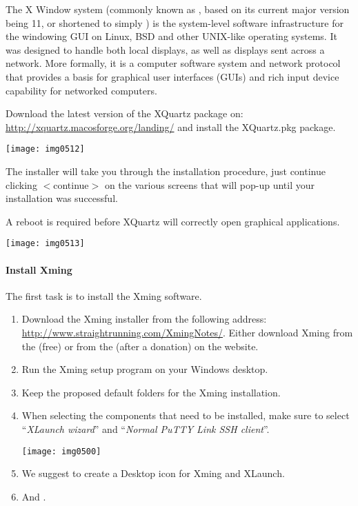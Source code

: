 The X Window system (commonly known as , based on its current major
version being 11, or shortened to simply ) is the system-level
software infrastructure for the windowing GUI on Linux, BSD and other UNIX-like
operating systems. It was designed to handle both local displays, as well as
displays sent across a network. More formally, it is a computer software system
and network protocol that provides a basis for graphical user interfaces (GUIs)
and rich input device capability for networked computers.

\ifmac
  Download the latest version of the XQuartz package on:
  \url{http://xquartz.macosforge.org/landing/}
  and install the XQuartz.pkg package.

  \begin{center}
  \texttt{[image: img0512]}
  \end{center}

  The installer will take you through the installation procedure, just continue
  clicking $<$continue$>$ on the various screens that will pop-up until your
  installation was successful.

  A reboot is required before XQuartz will correctly open graphical applications.

  \begin{center}
  \texttt{[image: img0513]}
  \end{center}
\fi

\ifwindows
  \paragraph{Install Xming}

  The first task is to install the Xming software.

  \begin{enumerate}
    \item  Download the Xming installer from the following
      address: \url{http://www.straightrunning.com/XmingNotes/}. Either download Xming
      from the  (free) or from the  (after a donation) on the website.
    \item  Run the Xming setup program on your Windows desktop.
    \item  Keep the proposed default folders for the Xming installation.
    \item  When selecting the components that need to be installed, make sure to
      select ``\emph{XLaunch wizard}'' and ``\emph{Normal PuTTY Link SSH client}''.

  \begin{center}
  \texttt{[image: img0500]}
  \end{center}

  \item  We suggest to create a Desktop icon for Xming and XLaunch.
  \item  And .
  \end{enumerate}

